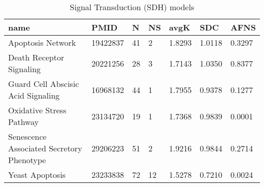 \begin{table}
\centering
\caption{Signal Transduction (SDH) models}
\label{tab:Signal_Transduction_(SDH)}
\begin{tabular}{|p{180pt}||p{40pt}|p{25pt}|p{25pt}|p{40pt}|p{25pt}|p{25pt}|}
\toprule
 name & PMID &N &NS & avgK &SDC & AFNS \\
\midrule
Apoptosis Network & 19422837 & 41 & 2 & 1.8293 & 1.0118 & 0.3297 \\
Death Receptor Signaling & 20221256 & 28 & 3 & 1.7143 & 1.0350 & 0.8377 \\
Guard Cell Abscisic Acid Signaling & 16968132 & 44 & 1 & 1.7955 & 0.9378 & 0.1277 \\
Oxidative Stress Pathway & 23134720 & 19 & 1 & 1.7368 & 0.9839 & 0.0001 \\
Senescence Associated Secretory Phenotype & 29206223 & 51 & 2 & 1.9216 & 0.9844 & 0.2714 \\
Yeast Apoptosis & 23233838 & 72 & 12 & 1.5278 & 0.7210 & 0.0024 \\
\bottomrule
\end{tabular}
\end{table}
